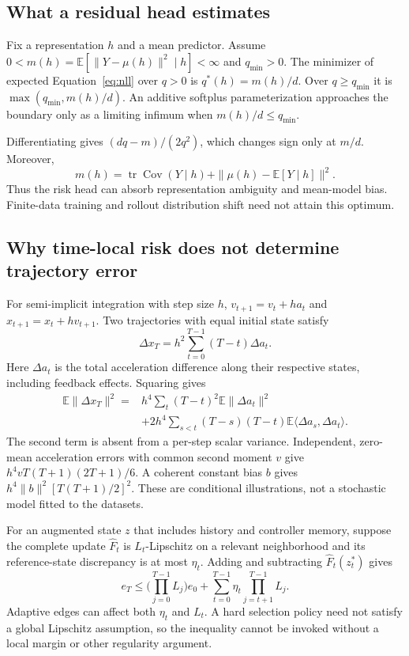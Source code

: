 \subsection{What a residual head estimates}
\label{sec:residual-moment}
\begin{proposition}
Fix a representation $h$ and a mean predictor. Assume $0<m(h)=\mathbb E[\|Y-\mu(h)\|^2\mid h]<\infty$ and $q_{\min}>0$. The minimizer of expected Equation~\ref{eq:nll} over $q>0$ is $q^*(h)=m(h)/d$. Over $q\ge q_{\min}$ it is $\max(q_{\min},m(h)/d)$. An additive softplus parameterization approaches the boundary only as a limiting infimum when $m(h)/d\le q_{\min}$.
\end{proposition}
Differentiating gives $(dq-m)/(2q^2)$, which changes sign only at $m/d$. Moreover,
\begin{equation}
 m(h)=\operatorname{tr}\operatorname{Cov}(Y\mid h)
       +\|\mu(h)-\mathbb E[Y\mid h]\|^2.
\end{equation}
Thus the risk head can absorb representation ambiguity and mean-model bias. Finite-data training and rollout distribution shift need not attain this optimum.

\subsection{Why time-local risk does not determine trajectory error}
For semi-implicit integration with step size $h$,
$v_{t+1}=v_t+ha_t$ and $x_{t+1}=x_t+hv_{t+1}$.
Two trajectories with equal initial state satisfy
\begin{equation}
 \Delta x_T=h^2\sum_{t=0}^{T-1}(T-t)\Delta a_t.
\end{equation}
Here $\Delta a_t$ is the total acceleration difference along their respective states, including feedback effects. Squaring gives
\begin{align}
 \mathbb E\|\Delta x_T\|^2
 ={}&h^4\sum_t(T-t)^2\mathbb E\|\Delta a_t\|^2\nonumber\\
 &+2h^4\sum_{s<t}(T-s)(T-t)
       \mathbb E\langle\Delta a_s,\Delta a_t\rangle.
\end{align}
The second term is absent from a per-step scalar variance. Independent, zero-mean acceleration errors with common second moment $v$ give $h^4vT(T+1)(2T+1)/6$. A coherent constant bias $b$ gives $h^4\|b\|^2[T(T+1)/2]^2$. These are conditional illustrations, not a stochastic model fitted to the datasets.

For an augmented state $z$ that includes history and controller memory, suppose the complete update $\widehat F_t$ is $L_t$-Lipschitz on a relevant neighborhood and its reference-state discrepancy is at most $\eta_t$. Adding and subtracting $\widehat F_t(z_t^*)$ gives
\begin{equation}
 e_T\le\Big(\prod_{j=0}^{T-1}L_j\Big)e_0+
 \sum_{t=0}^{T-1}\eta_t\prod_{j=t+1}^{T-1}L_j.
\end{equation}
Adaptive edges can affect both $\eta_t$ and $L_t$. A hard selection policy need not satisfy a global Lipschitz assumption, so the inequality cannot be invoked without a local margin or other regularity argument.

